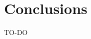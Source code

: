 \documentclass[fleqn, 11pt]{SelfArx} %
\begin{document}

\section{Conclusions}
TO-DO




\nocite{*}

\end{document}
